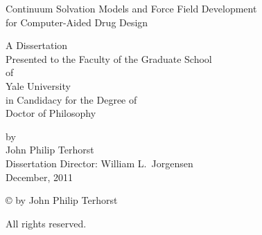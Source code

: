 \documentclass[12pt]{report}
\begin{document}
\begin{center}
\begin{singlespace}

\vspace*{3cm}

              Continuum Solvation Models and Force Field Development \\
                        for Computer-Aided Drug Design

\vspace*{5cm}

                              A Dissertation \\
              Presented to the Faculty of the Graduate School \\
                                    of \\
                             Yale University \\
                      in Candidacy for the Degree of \\
                           Doctor of Philosophy

\vspace*{5cm}

                                     by \\
                            John Philip Terhorst \\
\bigskip
                  Dissertation Director: William L.\ Jorgensen\\
\bigskip                  
                               December, 2011

\end{singlespace}
\newpage



\vspace*{4cm}

              \copyright {} by John Philip Terhorst

                            All rights reserved.
\end{center}
\newpage

\end{document}
